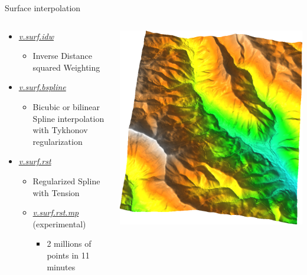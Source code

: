 \documentclass[xcolor={dvipsnames,usenames},beamer,aspectratio=169]{beamer}
\newcommand{\gmodule}[1]{\href{http://grass.osgeo.org/grass71/manuals/#1.html}{\emph{#1}}}
\begin{document}
\begin{frame}{Surface interpolation}

\begin{columns}
\begin{column}{0.5\textwidth}

\begin{itemize}
  \item \gmodule{v.surf.idw}
  \begin{itemize}
    \item Inverse Distance squared Weighting
  \end{itemize}
  \item \gmodule{v.surf.bspline}
  \begin{itemize}
    \item Bicubic or bilinear Spline interpolation with Tykhonov regularization
  \end{itemize}
  \item \gmodule{v.surf.rst}
  \begin{itemize}
    \item Regularized Spline with Tension
    \item \gmodule{v.surf.rst.mp} (experimental)
    \begin{itemize}
      \item 2 millions of points in 11 minutes
    \end{itemize}
  \end{itemize}
\end{itemize}

\end{column}
\begin{column}{0.4\textwidth}

\begin{center}
\includegraphics[width=\textwidth]{features/surface}
\end{center}


\end{column}
\end{columns}
\end{frame}
\end{document}
